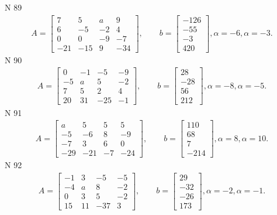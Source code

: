 \documentclass[11pt]{report}
\begin{document}
N 89
\begin{align*}
 A = \left[\begin{matrix}7 & 5 & a & 9\\6 & -5 & -2 & 4\\0 & 0 & -9 & -7\\-21 & -15 & 9 & -34\end{matrix}\right],
    \qquad b = \left[\begin{matrix}-126\\-55\\-3\\420\end{matrix}\right], \alpha = -6, \alpha = -3. 
 \end{align*}
N 90
\begin{align*}
 A = \left[\begin{matrix}0 & -1 & -5 & -9\\-5 & a & 5 & -2\\7 & 5 & 2 & 4\\20 & 31 & -25 & -1\end{matrix}\right],
    \qquad b = \left[\begin{matrix}28\\-28\\56\\212\end{matrix}\right], \alpha = -8, \alpha = -5. 
 \end{align*}
N 91
\begin{align*}
 A = \left[\begin{matrix}a & 5 & 5 & 5\\-5 & -6 & 8 & -9\\-7 & 3 & 6 & 0\\-29 & -21 & -7 & -24\end{matrix}\right],
    \qquad b = \left[\begin{matrix}110\\68\\7\\-214\end{matrix}\right], \alpha = 8, \alpha = 10. 
 \end{align*}
N 92
\begin{align*}
 A = \left[\begin{matrix}-1 & 3 & -5 & -5\\-4 & a & 8 & -2\\0 & 3 & 5 & -2\\15 & 11 & -37 & 3\end{matrix}\right],
    \qquad b = \left[\begin{matrix}29\\-32\\-26\\173\end{matrix}\right], \alpha = -2, \alpha = -1. 
 \end{align*}
\end{document}

